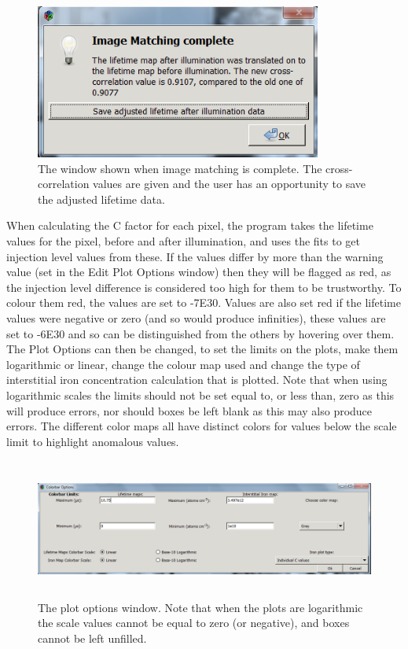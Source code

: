\documentclass[final,a4paper,oneside,12pt]{article}
\begin{document}
\begin{figure}[h!]
\includegraphics[height=2in]{2imagematchingcomplete}
\caption{\label{figure2} The window shown when image matching is complete. The cross-correlation values are given and the user has an opportunity to save the adjusted lifetime data.}
\end{figure}

\pagebreak

When calculating the C factor for each pixel, the program takes the lifetime values for the pixel, before and after illumination, and uses the fits to get injection level values from these. If the values differ by more than the warning value (set in the Edit Plot Options window) then they will be flagged as red, as the injection level difference is considered too high for them to be trustworthy. To colour them red, the values are set to -7E30. Values are also set red if the lifetime values were negative or zero (and so would produce infinities), these values are set to -6E30 and so can be distinguished from the others by hovering over them.
\\
The Plot Options can then be changed, to set the limits on the plots, make them logarithmic or linear, change the colour map used and change the type of interstitial iron concentration calculation that is plotted. Note that when using logarithmic scales the limits should not be set equal to, or less than, zero as this will produce errors, nor should boxes be left blank as this may also produce errors. The different color maps all have distinct colors for values below the scale limit to highlight anomalous values.

\begin{figure}[h!]
\includegraphics[height=1.8in]{editcolorbar}
\caption{\label{figure2} The plot options window. Note that when the plots are logarithmic the scale values cannot be equal to zero (or negative), and boxes cannot be left unfilled.}
\end{figure}
\end{document}
